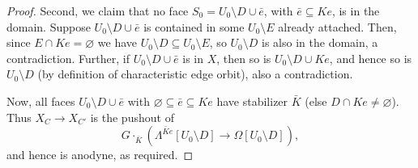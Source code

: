 \documentclass[a4paper,10pt,draft]{article}%
\numberwithin{equation}{section}%
\numberwithin{figure}{section}
\begin{document}
\begin{proof}
      Second, we claim that no face $S_0 = U_0 \setminus D \cup \bar e$, with $\bar e \subseteq K e$, is in the domain.
      Suppose $U_0 \setminus D \cup \bar e$ is contained in some $U_0 \setminus E$ already attached.
      Then, since $E \cap K e = \varnothing$ we have $U_0 \setminus D \subseteq U_0 \setminus E$, so
      $U_0 \setminus D$ is also in the domain, a contradiction.
      Further, if $U_0 \setminus D \cup \bar e$ is in $X$, then so is $U_0 \setminus D \cup K e$, and hence
      so is $U_0 \setminus D$ (by definition of characteristic edge orbit), also a contradiction.

      Now, all faces $U_0 \setminus D \cup \bar e$ with $\varnothing \subseteq \bar e \subseteq K e$ have stabilizer $\bar K$
      (else $D \cap K e \neq \varnothing$).
      Thus $X_C \to X_{C'}$ is the pushout of
      \begin{equation}
            \label{CHAR_HORN_EQ}
            G \cdot_{\bar K} \left( \Lambda^{\bar K e}[U_0 \setminus D] \to \Omega[U_0 \setminus D] \right),
      \end{equation}
      and hence is anodyne, as required.
\end{proof}
\end{document}
